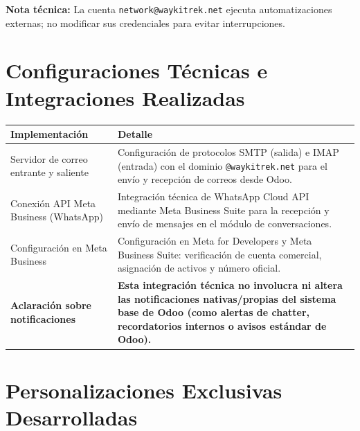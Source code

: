 \documentclass[10pt,a4paper]{article}
\begin{document}
\vspace{0.1em}
{\footnotesize\textbf{Nota técnica:} La cuenta \texttt{network@waykitrek.net} ejecuta automatizaciones externas; no modificar sus credenciales para evitar interrupciones.}

\section{Configuraciones Técnicas e Integraciones Realizadas}

\noindent
\begin{tabularx}{\linewidth}{|H|Y|}
\hline
{}
\bfseries\color{waykigreen}Implementación &
\bfseries\color{waykigreen}Detalle \\
\hline
Servidor de correo entrante y saliente &
Configuración de protocolos SMTP (salida) e IMAP (entrada) con el dominio \texttt{@waykitrek.net} para el envío y recepción de correos desde Odoo. \\
\hline
{}
Conexión API Meta Business (WhatsApp) &
Integración técnica de WhatsApp Cloud API mediante Meta Business Suite para la recepción y envío de mensajes en el módulo de conversaciones. \\
\hline
Configuración en Meta Business &
Configuración en Meta for Developers y Meta Business Suite: verificación de cuenta comercial, asignación de activos y número oficial. \\
\hline
{}
\textbf{Aclaración sobre notificaciones} &
\textbf{Esta integración técnica no involucra ni altera las notificaciones nativas/propias del sistema base de Odoo (como alertas de chatter, recordatorios internos o avisos estándar de Odoo).} \\
\hline
\end{tabularx}

\newpage

\section{Personalizaciones Exclusivas Desarrolladas}
\end{document}
